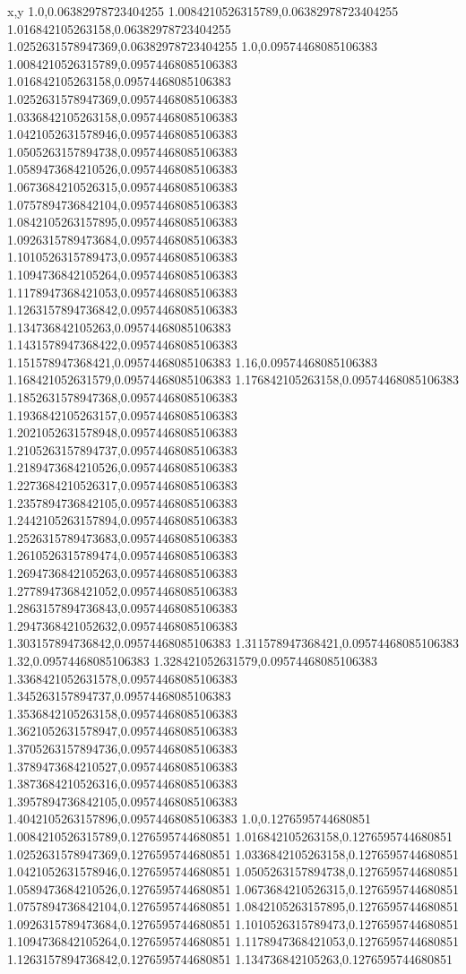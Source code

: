 x,y
1.0,0.06382978723404255
1.0084210526315789,0.06382978723404255
1.016842105263158,0.06382978723404255
1.0252631578947369,0.06382978723404255
1.0,0.09574468085106383
1.0084210526315789,0.09574468085106383
1.016842105263158,0.09574468085106383
1.0252631578947369,0.09574468085106383
1.0336842105263158,0.09574468085106383
1.0421052631578946,0.09574468085106383
1.0505263157894738,0.09574468085106383
1.0589473684210526,0.09574468085106383
1.0673684210526315,0.09574468085106383
1.0757894736842104,0.09574468085106383
1.0842105263157895,0.09574468085106383
1.0926315789473684,0.09574468085106383
1.1010526315789473,0.09574468085106383
1.1094736842105264,0.09574468085106383
1.1178947368421053,0.09574468085106383
1.1263157894736842,0.09574468085106383
1.134736842105263,0.09574468085106383
1.1431578947368422,0.09574468085106383
1.151578947368421,0.09574468085106383
1.16,0.09574468085106383
1.168421052631579,0.09574468085106383
1.176842105263158,0.09574468085106383
1.1852631578947368,0.09574468085106383
1.1936842105263157,0.09574468085106383
1.2021052631578948,0.09574468085106383
1.2105263157894737,0.09574468085106383
1.2189473684210526,0.09574468085106383
1.2273684210526317,0.09574468085106383
1.2357894736842105,0.09574468085106383
1.2442105263157894,0.09574468085106383
1.2526315789473683,0.09574468085106383
1.2610526315789474,0.09574468085106383
1.2694736842105263,0.09574468085106383
1.2778947368421052,0.09574468085106383
1.2863157894736843,0.09574468085106383
1.2947368421052632,0.09574468085106383
1.303157894736842,0.09574468085106383
1.311578947368421,0.09574468085106383
1.32,0.09574468085106383
1.328421052631579,0.09574468085106383
1.3368421052631578,0.09574468085106383
1.345263157894737,0.09574468085106383
1.3536842105263158,0.09574468085106383
1.3621052631578947,0.09574468085106383
1.3705263157894736,0.09574468085106383
1.3789473684210527,0.09574468085106383
1.3873684210526316,0.09574468085106383
1.3957894736842105,0.09574468085106383
1.4042105263157896,0.09574468085106383
1.0,0.1276595744680851
1.0084210526315789,0.1276595744680851
1.016842105263158,0.1276595744680851
1.0252631578947369,0.1276595744680851
1.0336842105263158,0.1276595744680851
1.0421052631578946,0.1276595744680851
1.0505263157894738,0.1276595744680851
1.0589473684210526,0.1276595744680851
1.0673684210526315,0.1276595744680851
1.0757894736842104,0.1276595744680851
1.0842105263157895,0.1276595744680851
1.0926315789473684,0.1276595744680851
1.1010526315789473,0.1276595744680851
1.1094736842105264,0.1276595744680851
1.1178947368421053,0.1276595744680851
1.1263157894736842,0.1276595744680851
1.134736842105263,0.1276595744680851
